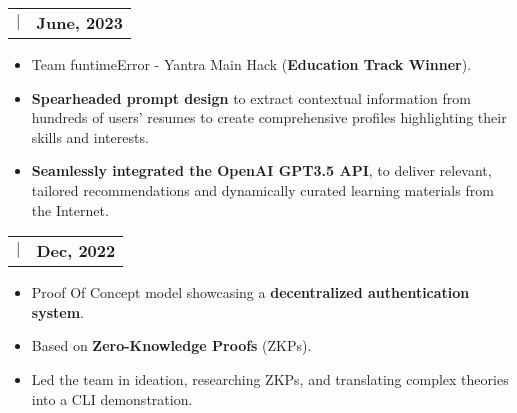 \documentclass[letterpaper,11pt]{article}
\makeatletter
\newcommand{\uniformunderline}[1]{%
  \uline{\phantom{#1}}%
  \llap{\contour{white}{#1}}%
}
\newcommand{\resumeItem}[1]{
  \item\small{
    {#1 \vspace{-2pt}}
  }
}
\newcommand{\resumeProjectHeading}[2]{
    \item
    \begin{tabular*}{1.001\textwidth}{l@{\extracolsep{\fill}}r}
      \small#1 & \textbf{\small #2}\\
    \end{tabular*}\vspace{-7pt}
}
\newcommand{\resumeItemListStart}{\begin{itemize}}
\newcommand{\resumeItemListEnd}{\end{itemize}\vspace{-5pt}}
\makeatother
\begin{document}
       \resumeProjectHeading
          {\href{https://github.com/kaushalrathi24/funtimeError}{\textbf{\large{\uniformunderline{Career Node}}} \href{https://github.com/kaushalrathi24/funtimeError}{\raisebox{-0.1\height}\faExternalLink }} $|$ \normalsize{\uniformunderline{ChatGPT 3.5, TypeScript, Flask, Hugging Face Models}}}{June, 2023}
          \vspace{-11pt}
          \resumeItemListStart
            \resumeItem{\normalsize{Team funtimeError - Yantra Main Hack (\textbf{Education Track Winner}).}} \vspace{-0.1pt}
            \resumeItem{\normalsize{\textbf{Spearheaded prompt design} to extract contextual information from hundreds of users' resumes to create comprehensive profiles highlighting their skills and interests.}} 
            \resumeItem{\normalsize{\textbf{Seamlessly integrated the OpenAI GPT3.5 API}, to deliver relevant, tailored recommendations and dynamically curated learning materials from the Internet.}} 
          \resumeItemListEnd 
          \vspace{-15pt}
          
      \resumeProjectHeading
          {\href{https://github.com/ACM-VIT/accessDenied}{\textbf{\large{\uniformunderline{Access Denied}}} \href{https://github.com/ACM-VIT/accessDenied}{\raisebox{-0.1\height}\faExternalLink }} $|$ \normalsize{\uniformunderline{Python, JavaScript, \href{https://colab.research.google.com/drive/1oTl9P42TniMFApstGZ4R4WLa_jZR1WrS}{\textbf{Jupyter Notebook}}} {\raisebox{-0.1\height}\faExternalLink}}}{Dec, 2022}
          \vspace{-11pt}
          \resumeItemListStart
            \resumeItem{\normalsize{Proof Of Concept model showcasing a \textbf{decentralized authentication system}.}} 
            \resumeItem{\normalsize{Based on \textbf{Zero-Knowledge Proofs} (ZKPs).}} 
            \resumeItem{\normalsize{Led the team in ideation, researching ZKPs, and translating complex theories into a CLI demonstration.}}
          \resumeItemListEnd
\end{document}

